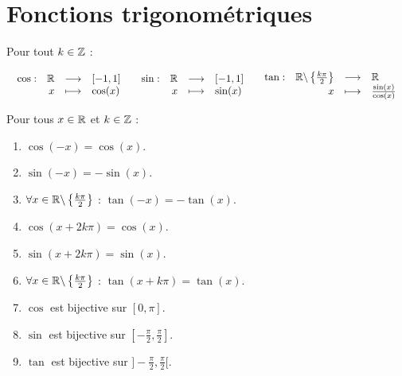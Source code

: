 \section{Fonctions trigonométriques}
\begin{definition}
	Pour tout $k \in \mathbb{Z}$ :	
	\begin{center}
		$
		\begin{array}{ccc}
			\begin{array}{rrcl} \cos : & \mathbb{R} & \longrightarrow & [-1,1] \\ & x & \longmapsto & \cos(x) \end{array}
			&
			\begin{array}{rrcl} \sin : & \mathbb{R} & \longrightarrow & [-1,1] \\ & x & \longmapsto & \sin(x) \end{array}
			&
			\begin{array}{rrcl} \tan : & \mathbb{R} \backslash \left\{ \frac{k \pi}{2} \right\} & \longrightarrow & \mathbb{R} \\ & x & \longmapsto & \frac{\sin(x)}{\cos(x)} \end{array}
		\end{array}
		$
	\end{center}	
\end{definition}

\begin{proposition}
	Pour tous $x \in \mathbb{R}$ et $k \in \mathbb{Z}$ :
	\begin{enumerate}
		\item $\cos(-x) = \cos(x)$.
		\item $\sin(-x) = -\sin(x)$.
		\item $\forall x \in \mathbb{R} \backslash \left\{\frac{k\pi}{2}\right\}$ : $\tan(-x) = -\tan(x)$.
		\item $\cos(x + 2k\pi) = \cos(x)$.
		\item $\sin(x + 2k\pi) = \sin(x)$.
		\item $\forall x \in \mathbb{R} \backslash \left\{\frac{k\pi}{2}\right\}$ : $\tan(x + k\pi) = \tan(x)$.
		\item $\cos$ est bijective sur $[0, \pi]$.
		\item $\sin$ est bijective sur $[-\frac{\pi}{2}, \frac{\pi}{2}]$.
		\item $\tan$ est bijective sur $]-\frac{\pi}{2}, \frac{\pi}{2}[$.
	\end{enumerate}
\end{proposition}

